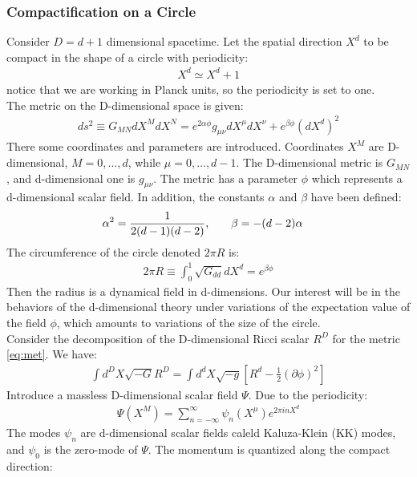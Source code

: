 \subsubsection{Compactification on a Circle}
Consider $D=d+1$ dimensional spacetime. Let the spatial direction $X^{d}$ to be compact in the shape of a circle with periodicity:
\begin{align}
    X^{d} \simeq X^{d} +1
\end{align}
notice that we are working in Planck units, so the periodicity is set to one. \\
\indent The metric on the D-dimensional space is given:
\begin{align}
    \label{eq:met}
    ds^{2} \equiv G_{MN} dX^{M}dX^{N} = e^{2\alpha\phi}g_{\mu\nu} dX^{\mu}dX^{\nu} + e^{\beta\phi}(dX^{d})^{2}
\end{align}
There some coordinates and parameters are introduced. Coordinates $X^{M}$ are D-dimensional, $M=0, \dotso , d$, while $\mu = 0, \dotso ,d-1$. The D-dimensional metric is $G_{MN}$, and d-dimensional one is $g_{\mu\nu}$. The metric has a parameter $\phi$ which represents a d-dimensional scalar field. In addition, the constants $\alpha$ and $\beta$ have been defined:
\begin{align}
    \alpha^{2} = \frac{1}{2(d-1)(d-2)} , & \qq{} \beta = -(d-2) \alpha
\end{align}
The circumference of the circle denoted $2\pi R$ is:
\begin{align}
    \label{eq:circ}
    2\pi R \equiv \int _{0}^{1} \sqrt{G_{dd}}dX^{d} = e^{\beta\phi}
\end{align}
Then the radius is a dynamical field in d-dimensions. Our interest will be in the behaviors of the d-dimensional theory under variations of the expectation value of the field $\phi$, which amounts to variations of the size of the circle. \\
\indent Consider the decomposition of the D-dimensional Ricci scalar $R^{D}$ for the metric \ref{eq:met}. We have:
\begin{align}
    \label{eq:eff}
    \int d^{D}X \sqrt{-G} R^{D} = \int d^{d}X \sqrt{-g} \left[R^{d} -\frac{1}{2} (\partial \phi)^{2} \right]
\end{align}
Introduce a massless D-dimensional scalar field $\Psi$. Due to the periodicity:
\begin{align}
    \Psi (X^{M}) = \sum_{n=-\infty}^{\infty} \psi_{n} (X^{\mu}) e^{2\pi i n X^{d}}
\end{align}
The modes $\psi _n$ are d-dimensional scalar fields caleld Kaluza-Klein (KK) modes, and $\psi _{0}$ is the zero-mode of $\Psi$. The momentum is quantized along the compact direction:
